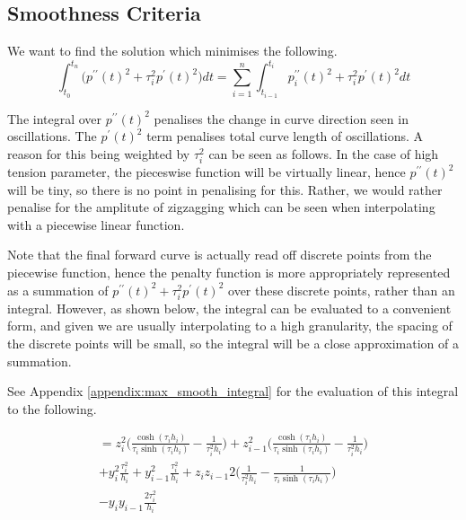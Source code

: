 \documentclass{article}
\begin{document}
\subsection{Smoothness Criteria}
We want to find the solution which minimises the following.
\begin{equation}
    \int_{t_0}^{t_n} \bigl( p^{\prime\prime}(t)^2 + \tau_i^2 p^{\prime}(t)^2 \bigr) dt = 
    \sum_{i=1}^{n}\int_{t_{i - 1}}^{t_i}p^{\prime\prime}_i(t)^2 + \tau_i^2 p^{\prime}(t)^2 dt
\end{equation}

The integral over $p^{\prime\prime}(t)^2$ penalises the change in curve direction
seen in oscillations. The $p^{\prime}(t)^2$ term penalises total curve length
of oscillations. A reason for this being weighted by $\tau_i^2 $ can be seen as follows.
In the case of high tension parameter, the pieceswise function will be virtually linear,
hence $p^{\prime\prime}(t)^2$ will be tiny, so there is no point in penalising for this.
Rather, we would rather penalise for the amplitute of
zigzagging which can be seen when interpolating with a piecewise linear function.

\bigskip

Note that the final forward curve is actually read off discrete points from the piecewise
function, hence the penalty function is more appropriately represented as a summation
of $p^{\prime\prime}(t)^2 + \tau_i^2 p^{\prime}(t)^2$ over these discrete points, rather 
than an integral. However, as shown below, the integral 
can be evaluated to a convenient form, and given we are usually interpolating to a high
granularity, the spacing of the discrete points will be small, so the integral will be 
a close approximation of a summation.

\bigskip

See Appendix \ref{appendix:max_smooth_integral} for the evaluation of this integral to the
following.

\begin{multline}
    = z_i^2 \biggl( \frac{\cosh(\tau_i h_i)}{\tau_i \sinh(\tau_i h_i)} -
    \frac{1}{\tau_i^2 h_i} \biggr) 
    + z_{i-1}^2 \biggl( \frac{\cosh(\tau_i h_i)}{\tau_i \sinh(\tau_i h_i)} -
    \frac{1}{\tau_i^2 h_i} \biggr) \\
    + y_i^2 \frac{\tau_i^2}{h_i} + y_{i-1}^2 \frac{\tau_i^2}{h_i} 
    + z_i z_{i-1} 2 \biggl( \frac{1}{\tau_i^2 h_i} - \frac{1}{\tau_i \sinh(\tau_i h_i)} \biggr) \\
    - y_i y_{i-1} \frac{2 \tau_i^2}{h_i}
\end{multline}
\end{document}
